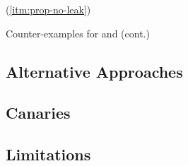 \begin{table}
    \ContinuedFloat
    \begin{subtable}{\textwidth}
        \centering
        
        \caption{ (\ref{itm:prop-no-leak})}
        \label{tbl:cex-no-leak-ccod}
    \end{subtable}
    \caption{Counter-examples for  and  (cont.)}
\end{table}

\subsection{Alternative Approaches}
\label{sec:alt-approaches}

\subsection{Canaries}
\label{sec:canaries}

\subsection{Limitations}
